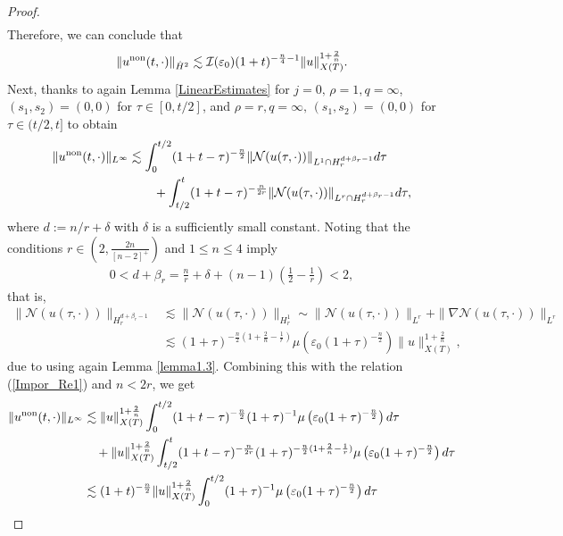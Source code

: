\documentclass[11pt,reqno]{amsart}
\begin{document}
\begin{proof}
\begin{align}
\end{align}
Therefore, we can conclude that 
    \begin{align}
        \|u^{\rm non}(t,\cdot)\|_{\dot{H}^2} \lesssim \mathcal{I}(\varepsilon_0)(1+t)^{-\frac{n}{4}-1} \|u\|_{X(T)}^{1+\frac{2}{n}}. \label{Main.Es.1}
    \end{align}
 Next, thanks to again 
         Lemma \ref{LinearEstimates} for $j =0, \,\rho = 1, q = \infty$, $(s_1, s_2) = (0,0)$ for $\tau \in [0, t/2]$, and $\rho =r, q= \infty, \,(s_1, s_2) =(0,0)$ for $\tau \in (t/2, t]$ to obtain
    \begin{align*}
        \|u^{\rm non}(t,\cdot)\|_{L^\infty} &\lesssim \int_0^{t/2} (1+t-\tau)^{-\frac{n}{2}} \|\mathcal{N}(u(\tau,\cdot))\|_{L^1 \cap H_r^{d+\beta_r-1}} d\tau\\
        &\qquad +\int_{t/2}^t (1+t-\tau)^{-\frac{n}{2r}} \|\mathcal{N}(u(\tau,\cdot))\|_{L^r \cap H_r^{d+\beta_r-1}} d\tau,
    \end{align*}
    where $d := n/r +\delta$ with $\delta$ is a sufficiently small constant. 
Noting that the conditions $r \in \left(2, \displaystyle\frac{2n}{[n-2]^+}\right)$ and $1 \leq n \leq 4$ imply
\begin{align}
    0 < d + \beta_r = \frac{n}{r} +\delta + (n-1)\left(\frac{1}{2}-\frac{1}{r}\right) < 2,  \label{Re10}
\end{align}
   that is, 
   \begin{align*}
       \| \mathcal{N}(u(\tau,\cdot))\|_{H_r^{d+\beta_r-1}} &\lesssim \| \mathcal{N}(u(\tau,\cdot))\|_{H_r^1} \sim \|\mathcal{N}(u(\tau,\cdot))\|_{L^r} + \|\nabla \mathcal{N}(u(\tau,\cdot))\|_{L^r}\\ 
       &\lesssim (1+\tau)^{-\frac{n}{2}(1+\frac{2}{n}-\frac{1}{r})} \mu\left(\varepsilon_0 (1+\tau)^{-\frac{n}{2}}\right) \|u\|_{X(T)}^{1+\frac{2}{n}},
   \end{align*}
   due to using again Lemma \ref{lemma1.3}. Combining this with the relation (\ref{Impor_Re1}) and $n < 2r$, we get
   \begin{align}
       \|u^{\rm non}(t,\cdot)\|_{L^\infty} &\lesssim \|u\|_{X(T)}^{1+\frac{2}{n}}\int_0^{t/2} (1+t-\tau)^{-\frac{n}{2}} (1+\tau)^{-1} \mu\left(\varepsilon_0(1+\tau)^{-\frac{n}{2}}\right) d\tau \notag\\
       &\quad+ \|u\|_{X(T)}^{1+\frac{2}{n}} \int_{t/2}^t (1+t-\tau)^{-\frac{n}{2r}} (1+\tau)^{-\frac{n}{2}(1+\frac{2}{n}-\frac{1}{r})} \mu\left(\varepsilon_0 (1+\tau)^{-\frac{n}{2}}\right) d\tau \notag\\
       &\lesssim (1+t)^{-\frac{n}{2}} \|u\|_{X(T)}^{1+\frac{2}{n}} \int_0^{t/2} (1+\tau)^{-1} \mu\left(\varepsilon_0 (1+\tau)^{-\frac{n}{2}}\right) d\tau \notag\\

\end{align}
\end{proof}
\end{document}
